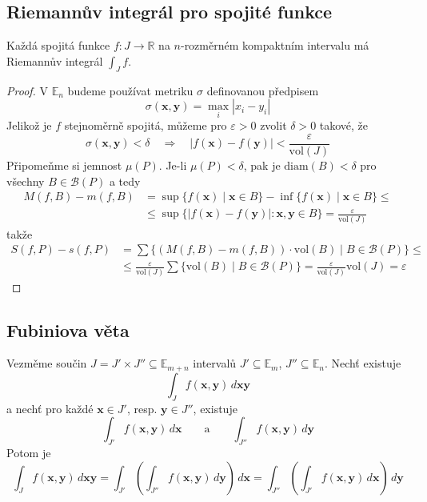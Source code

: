 \documentclass[../main.tex]{subfiles}
\begin{document}
\subsection{Riemannův integrál pro spojité funkce}
\begin{theorem}
	Každá spojitá funkce $f: J \to \mathbb{R}$ na $n$-rozměrném kompaktním intervalu má Riemannův integrál
	$\int_{J}f$.
\end{theorem}

\begin{proof}
	V $\mathbb{E}_n$ budeme používat metriku $\sigma$ definovanou předpisem
	\[ \sigma (\mathbf{x}, \mathbf{y}) = \max_{i} |x_i - y_i| \]
	Jelikož je $f$ stejnoměrně spojitá, můžeme pro $\varepsilon > 0$ zvolit $\delta > 0$ takové, že
	\[ \sigma (\mathbf{x}, \mathbf{y}) < \delta \quad \Rightarrow \quad
	|f(\mathbf{x}) - f(\mathbf{y})| < \frac{\varepsilon}{\textrm{vol}(J)} \]
	Připomeňme si jemnost $\mu (P)$. Je-li $\mu (P) < \delta$, pak je $\textrm{diam}(B) < \delta$ pro všechny
	$ B \in \mathcal{B}(P) $ a tedy
	\begin{align*}
			M(f, B) - m(f, B) &= \sup\{ f(\mathbf{x}) \mid \mathbf{x} \in B \} -
			\inf\{ f(\mathbf{x}) \mid \mathbf{x} \in B\}\leq\\
			&\leq \sup\{ |f(\mathbf{x}) - f(\mathbf{y})|: \mathbf{x}, \mathbf{y} \in B \}
			= \frac{\varepsilon}{\textrm{vol}(J)}
	\end{align*}
	takže
	\begin{align*}
			S(f,P) - s(f,P) &= \sum \{ (M(f,B) - m(f,B))\cdot \textrm{vol}(B) \mid B\in \mathcal{B}(P) \}\leq\\
			&\leq \frac{\varepsilon}{\textrm{vol}(J)}\sum \{ \textrm{vol}(B) \mid B\in \mathcal{B}(P) \}
			= \frac{\varepsilon}{\textrm{vol}(J)}\textrm{vol}(J) = \varepsilon
	\end{align*}
\end{proof}

\subsection{Fubiniova věta}
\begin{theorem}
	Vezměme součin $J = J' \times J'' \subseteq \mathbb{E}_{m+n}$ intervalů $J' \subseteq \mathbb{E}_m$,
	$J'' \subseteq \mathbb{E}_n$. Nechť existuje
	\[ \int_{J} f(\mathbf{x}, \mathbf{y}) \,d\mathbf{xy} \]
	a nechť pro každé $\mathbf{x} \in J'$, resp. $\mathbf{y} \in J''$, existuje
	\[ \int_{J'} f(\mathbf{x}, \mathbf{y}) \,d\mathbf{x} \qquad \text{a} \qquad \int_{J''} f(\mathbf{x}, \mathbf{y}) \,d\mathbf{y} \]
	Potom je
	\[ \int_J f(\mathbf{x}, \mathbf{y}) \,d\mathbf{xy} =
	\int_{J'} \left( \int_{J''} f(\mathbf{x}, \mathbf{y}) \,d\mathbf{y} \right) \,d\mathbf{x} = 
	\int_{J''} \left( \int_{J'} f(\mathbf{x}, \mathbf{y}) \,d\mathbf{x} \right) \,d\mathbf{y}\]
\end{theorem}
\end{document}
